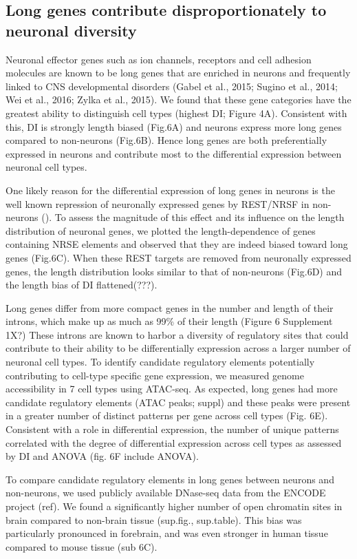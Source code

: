 \subsection{Long genes contribute disproportionately to neuronal diversity}

Neuronal effector genes such as ion channels, receptors and cell adhesion molecules are known to be long genes that are enriched in neurons and frequently linked to CNS developmental disorders (Gabel et al., 2015; Sugino et al., 2014; Wei et al., 2016; Zylka et al., 2015). We found that these gene categories have the greatest ability to distinguish cell types (highest DI; Figure 4A). Consistent with this, DI is strongly length biased (Fig.6A) and neurons express more long genes compared to non-neurons (Fig.6B). Hence long genes are both preferentially expressed in neurons and contribute most to the differential expression between neuronal cell types. 

One likely reason for the differential expression of long genes in neurons is the well known repression of neuronally expressed genes by REST/NRSF in non-neurons (). To assess the magnitude of this effect and its influence on the length distribution of neuronal genes, we plotted the length-dependence of genes containing NRSE elements and observed that they are indeed biased toward long genes (Fig.6C). When these REST targets are removed from neuronally expressed genes, the length distribution looks similar to that of non-neurons (Fig.6D) and the length bias of DI flattened(???).

Long genes differ from more compact genes in the number and length of their introns, which make up as much as 99\% of their length (Figure 6 Supplement 1X?) These introns are known to harbor a diversity of regulatory sites that could contribute to their ability to be differentially expression across a larger number of neuronal cell types. To identify candidate regulatory elements potentially contributing to cell-type specific gene expression, we measured genome accessibility in 7 cell types using ATAC-seq. As expected, long genes had more candidate regulatory elements (ATAC peaks; suppl) and these peaks were present in a greater number of distinct patterns per gene across cell types (Fig. 6E). Consistent with a role in differential expression, the number of unique patterns correlated with the degree of differential expression across cell types as assessed by DI and ANOVA (fig. 6F include ANOVA).

To compare candidate regulatory elements in long genes between neurons and non-neurons, we used publicly available DNase-seq data from the ENCODE project (ref). We found a significantly higher number of open chromatin sites in brain compared to non-brain tissue (sup.fig., sup.table). This bias was  particularly pronounced in forebrain, and was even stronger in human tissue compared to mouse tissue (sub 6C).